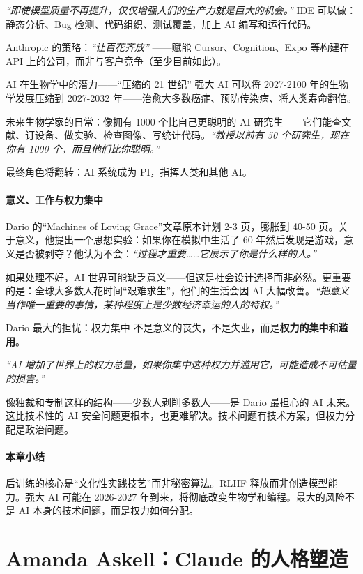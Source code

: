 \textit{``即使模型质量不再提升，仅仅增强人们的生产力就是巨大的机会。''} IDE 可以做：静态分析、Bug 检测、代码组织、测试覆盖，加上 AI 编写和运行代码。

Anthropic 的策略：\textit{``让百花齐放''} ——赋能 Cursor、Cognition、Expo 等构建在 API 上的公司，而非与客户竞争（至少目前如此）。

\begin{importantbox}{AI 在生物学中的潜力——``压缩的 21 世纪''}
强大 AI 可以将 2027-2100 年的生物学发展压缩到 2027-2032 年——治愈大多数癌症、预防传染病、将人类寿命翻倍。

未来生物学家的日常：像拥有 1000 个比自己更聪明的 AI 研究生——它们能查文献、订设备、做实验、检查图像、写统计代码。\textit{``教授以前有 50 个研究生，现在你有 1000 个，而且他们比你聪明。''}

最终角色将翻转：AI 系统成为 PI，指挥人类和其他 AI。
\end{importantbox}

\subsection{意义、工作与权力集中}

Dario 的``Machines of Loving Grace''文章原本计划 2-3 页，膨胀到 40-50 页。关于意义，他提出一个思想实验：如果你在模拟中生活了 60 年然后发现是游戏，意义是否被剥夺？他认为不会：\textit{``过程才重要……它展示了你是什么样的人。''}

如果处理不好，AI 世界可能缺乏意义——但这是社会设计选择而非必然。更重要的是：全球大多数人花时间``艰难求生''，他们的生活会因 AI 大幅改善。\textit{``把意义当作唯一重要的事情，某种程度上是少数经济幸运的人的特权。''}

\begin{warningbox}{Dario 最大的担忧：权力集中}
不是意义的丧失，不是失业，而是\textbf{权力的集中和滥用}。

\textit{``AI 增加了世界上的权力总量，如果你集中这种权力并滥用它，可能造成不可估量的损害。''}

像独裁和专制这样的结构——少数人剥削多数人——是 Dario 最担心的 AI 未来。这比技术性的 AI 安全问题更根本，也更难解决。技术问题有技术方案，但权力分配是政治问题。
\end{warningbox}

\subsection{本章小结}

后训练的核心是``文化性实践技艺''而非秘密算法。RLHF 释放而非创造模型能力。强大 AI 可能在 2026-2027 年到来，将彻底改变生物学和编程。最大的风险不是 AI 本身的技术问题，而是权力如何分配。

\part{Amanda Askell：Claude 的人格塑造}

